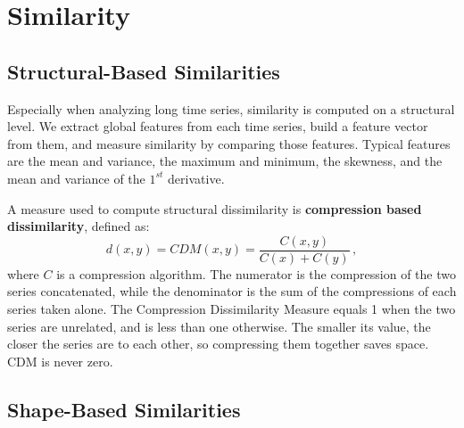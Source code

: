 \section{Similarity}

\subsection{Structural-Based Similarities}

Especially when analyzing long time series, similarity is computed on a structural level. We extract global features from each time series, build a feature vector from them, and measure similarity by comparing those features. Typical features are the mean and variance, the maximum and minimum, the skewness, and the mean and variance of the $1^{st}$ derivative.

A measure used to compute structural dissimilarity is \textbf{compression based dissimilarity}, defined as:
\begin{equation*}
    d(x,y) = \textit{CDM}(x,y) = \dfrac{C(x,y)}{C(x) + C(y)} \,,
\end{equation*}
where $C$ is a compression algorithm. The numerator is the compression of the two series concatenated, while the denominator is the sum of the compressions of each series taken alone. The Compression Dissimilarity Measure equals 1 when the two series are unrelated, and is less than one otherwise. The smaller its value, the closer the series are to each other, so compressing them together saves space. CDM is never zero.

\subsection{Shape-Based Similarities}

